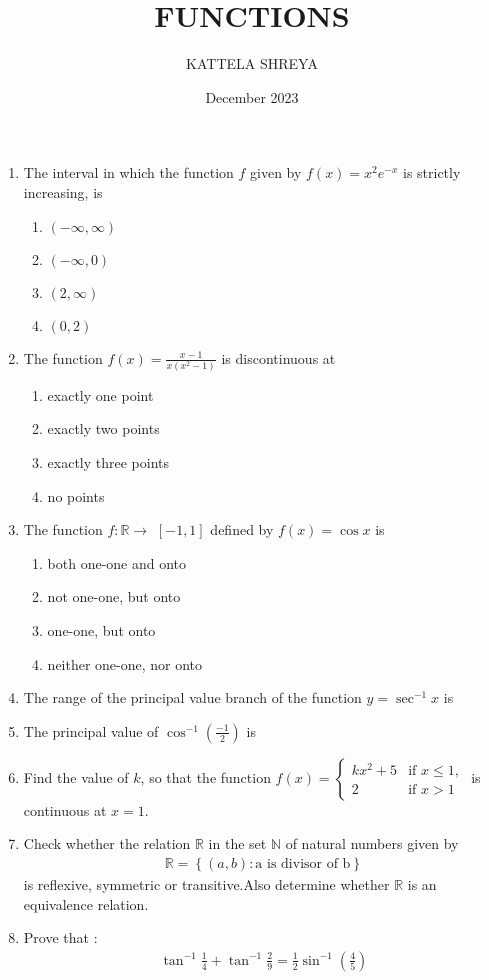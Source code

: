 \documentclass[12pt,-letter paper]{article}
\title{FUNCTIONS}
\author{KATTELA SHREYA}
\date{December 2023}
\providecommand{\sbrak}[1]{\ensuremath{{}\left[#1\right]}}
\providecommand{\brak}[1]{\ensuremath{\left(#1\right)}}
\providecommand{\cbrak}[1]{\ensuremath{\left\{#1\right\}}}
\begin{document}
             
\maketitle                   
\begin{enumerate}
\item The interval in which the function $f$ given by $f\brak{x}=x^{2}e^{-x}$ is strictly increasing, is         
\begin{enumerate}            
\item$\brak{-\infty, \infty}$     
\item$\brak{-\infty, 0}$      
\item$\brak{2 , \infty}$         
\item$\brak{0,2}$
\end{enumerate}             
\item The function $f\brak{x}=\frac{x-1} {x\brak{x^2-1}}$ is discontinuous at       
\begin{enumerate}
\item exactly one point     
\item exactly two points  
\item exactly three points 
\item no points            
\end{enumerate}            
\item The function $f:\mathbb{R}\to$ \sbrak{-1,1} defined by $f\brak{x}=\cos{x}$ is
\begin{enumerate}           
\item both one-one and onto
\item not one-one, but onto
\item one-one, but onto     
\item neither one-one, nor onto
\end{enumerate}
\item The range of the principal value branch of the function $y= \sec^{-1}x$ is 
\item The principal value of $\cos^{-1} \brak{\frac{-1}{2}}$ is 
\item Find the value of $k$, so that the function $f\brak{x} =
\begin{cases}kx^{2}+ 5  & \text{if } x\leq 1,  \\ 2  & \text{if } x > 1
\end{cases}$  is continuous at $x=1$.
\item Check whether the relation $\mathbb{R}$ in the set $\mathbb{N}$ of natural numbers given by
\begin{align}
	\mathbb{R} = \cbrak{\brak{a, b} :\text{a is divisor of b}}
\end{align}
is reflexive, symmetric or transitive.Also determine whether $\mathbb{R}$ is an equivalence relation.
\item Prove that :
\begin{align} 
\tan^{-1}\frac{1}{4}+\tan^{-1}\frac{2}{9}=\frac{1}{2}\sin^{-1}\brak{\frac{4}{5}}
\end{align}
\end{enumerate}
\end{document}

